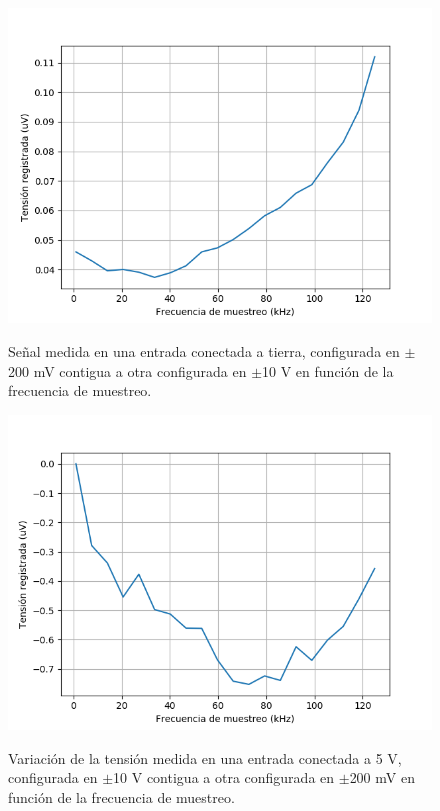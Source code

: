 \documentclass[a4paper,11pt]{article}
\begin{document}
\begin{figure}[h!]
\centering
\includegraphics[width=\columnwidth]{figs/settling0V.png}
\label{fig:settling1}
\caption{Señal medida en una entrada conectada a tierra, configurada en $\pm$200 mV contigua a otra configurada en $\pm$10 V en función de la frecuencia de muestreo.}
\end{figure}

\begin{figure}[h!]
\centering
\includegraphics[width=\columnwidth]{figs/settling5V.png}
\label{fig:settling2}
\caption{Variación de la tensión medida en una entrada conectada a 5 V, configurada en $\pm$10 V contigua a otra configurada en $\pm$200 mV en función de la frecuencia de muestreo.}
\end{figure}
\end{document}
